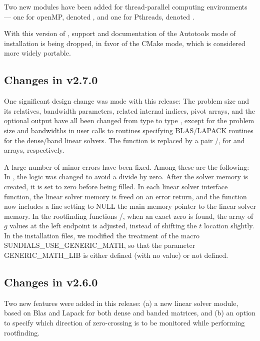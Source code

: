 Two new {\nvector} modules have been added for thread-parallel computing
environments --- one for openMP, denoted ,
and one for Pthreads, denoted .

With this version of {\sundials}, support and documentation of the
Autotools mode of installation is being dropped, in favor of the
CMake mode, which is considered more widely portable.

\subsection*{Changes in v2.7.0}

One significant design change was made with this release: The problem
size and its relatives, bandwidth parameters, related internal indices,
pivot arrays, and the optional output  have all been
changed from type  to type , except for the
problem size and bandwidths in user calls to routines specifying
BLAS/LAPACK routines for the dense/band linear solvers.  The function
 is replaced by a pair /,
for  and  arrays, respectively.

A large number of minor errors have been fixed.  Among these are the following:
In , the logic was changed to avoid a divide by zero.
After the solver memory is created, it is set to zero before being filled.
In each linear solver interface function, the linear solver memory is
freed on an error return, and the  function now includes a
line setting to NULL the main memory pointer to the linear solver memory.
In the rootfinding functions /, when an exact
zero is found, the array  of $g$ values at the left endpoint is
adjusted, instead of shifting the $t$ location  slightly.
In the installation files, we modified the treatment of the macro
SUNDIALS\_USE\_GENERIC\_MATH, so that the parameter GENERIC\_MATH\_LIB is
either defined (with no value) or not defined.

\subsection*{Changes in v2.6.0}

Two new features were added in this release: (a) a new linear solver module,
based on Blas and Lapack for both dense and banded matrices, and (b) an option
to specify which direction of zero-crossing is to be monitored while performing
rootfinding. 

